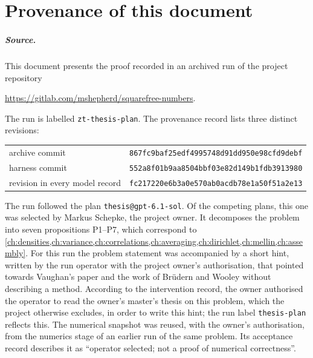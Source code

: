 \chapter{Provenance of this document}\label{app:provenance}

\paragraph{Source.} This document presents the proof recorded in an archived run of the project repository
\begin{center}\url{https://gitlab.com/mshepherd/squarefree-numbers}.\end{center}
The run is labelled \texttt{zt-thesis-plan}. The provenance record lists three distinct revisions:
\begin{center}
\begin{tabular}{@{}ll@{}}
archive commit & \texttt{867fc9baf25edf4995748d91dd950e98cfd9debf}\\
harness commit & \texttt{552a8f01b9aa8504bbf03e82d149b1fdb3913980}\\
revision in every model record & \texttt{fc217220e6b3a0e570ab0acdb78e1a50f51a2e13}
\end{tabular}
\end{center}
The run followed the plan \texttt{thesis@gpt-6.1-sol}. Of the competing plans, this one was selected by Markus Schepke, the project owner. It decomposes the problem into seven propositions P1--P7, which correspond to \cref{ch:densities,ch:variance,ch:correlations,ch:averaging,ch:dirichlet,ch:mellin,ch:assembly}. For this run the problem statement was accompanied by a short hint, written by the run operator with the project owner's authorisation, that pointed towards Vaughan's paper \cite{vaughan2005} and the work of Brüdern and Wooley \cite{bruedernwooley2011} without describing a method. According to the intervention record, the owner authorised the operator to read the owner's master's thesis on this problem, which the project otherwise excludes, in order to write this hint; the run label \texttt{thesis-plan} reflects this. The numerical snapshot was reused, with the owner's authorisation, from the numerics stage of an earlier run of the same problem. Its acceptance record describes it as ``operator selected; not a proof of numerical correctness''.

